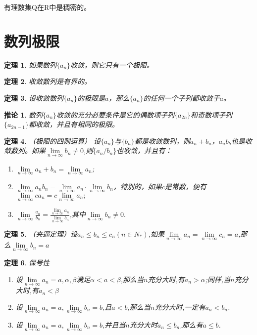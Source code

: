 \documentclass[UTF8]{ctexart}
\newtheorem{theorem}{定理}[section]
\newtheorem{coro}{推论}[theorem]
\begin{document}
有理数集Q在R中是稠密的。
	
\section{数列极限}
\begin{theorem}
    	如果数列$\{a_n\}$收敛，则它只有一个极限。
\end{theorem}
\begin{theorem}
收敛数列是有界的。
\end{theorem}
\begin{theorem}
设收敛数列$\{a_n\}$的极限是$a$，那么$\{a_n\}$的任何一个子列都收敛于$a$。
\end{theorem}
\begin{coro}
		数列$\{a_n\}$收敛的充分必要条件是它的偶数项子列$\{a_{2n}\}$和奇数项子列$\{a_{2n-1}\}$都收敛，并且有相同的极限。
\end{coro}
\begin{theorem}（极限的四则运算）
	设$\{a_n\}$与$\{b_n\}$都是收敛数列，则${a_n+b_n}$，${a_nb_b}$也是收敛数列。如果$\lim\limits_{n\to\infty}b_n\neq0$,则$\{a_n/b_n\}$也收敛，并且有：
\begin{enumerate}
	\item $\lim\limits_{n\to\infty}a_n+b_n=\lim\limits_{n\to\infty}a_n$;
	\item $\lim\limits_{n\to\infty}a_nb_n=\lim\limits_{n\to\infty}a_n \cdot \lim\limits_{n\to\infty}b_n$，特别的，如果$c$是常数，便有$\lim\limits_{n\to\infty}ca_n=c\lim\limits_{n\to\infty}a_n;$
	\item $\lim\limits_{n\to\infty} \frac{a_n}{b_n}=\frac{\lim\limits_{n\to\infty}a_n}{\lim\limits_{n\to\infty}b_n}$,其中$\lim\limits_{n\to\infty}b_n\neq0.$	
\end{enumerate}
\end{theorem}
\begin{theorem}
（夹逼定理）设$a_n\leq b_n \leq c_n (n\in N_*)$,如果$\lim\limits_{n\to\infty}a_n=\lim\limits_{n\to\infty}c_n=a$,那么$\lim\limits_{n\to\infty}b_n=a$
\end{theorem}
\begin{theorem}保号性
\begin{enumerate}
	\item 设$\lim\limits_{n\to\infty}a_n=a,\alpha,\beta$满足$\alpha<a<\beta$,那么当$n$充分大时,有$a_n>\alpha$;同样,当$n$充分大时,有$a_n<\beta$
	\item 设$\lim\limits_{n\to\infty}a_n=a,\lim\limits_{n\to\infty}b_n=b$,且$a<b$,那么当$n$充分大时,一定有$a_n<b_n$.
	\item 设$\lim\limits_{n\to\infty}a_n=a,\lim\limits_{n\to\infty}b_n=b$,并且当$n$充分大时$a_n\leq b_n$,那么有$a \leq b$.
\end{enumerate}
\end{theorem}
\end{document}
